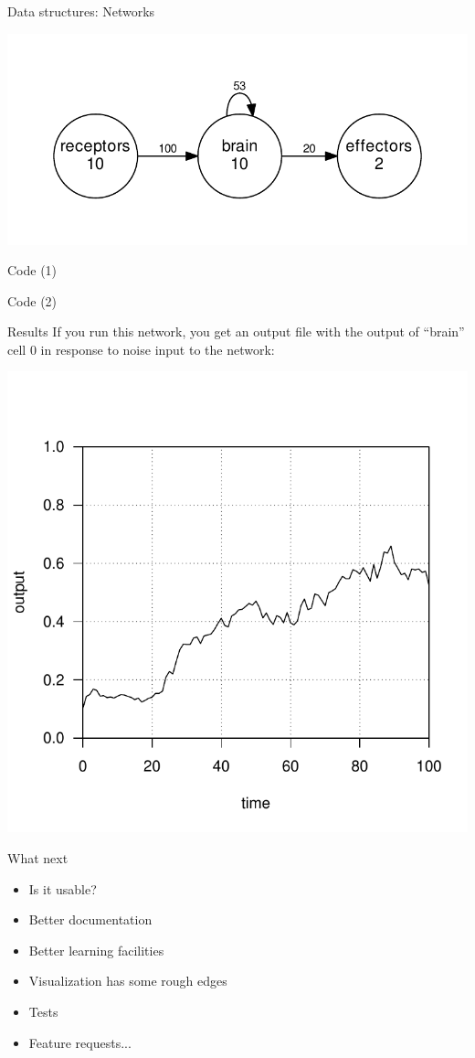 \documentclass[12pt]{beamer}
\begin{document}
\begin{frame}{Data structures: Networks}
  \begin{center}
  \includegraphics[width=.75\textwidth]{../../example/recnet/recnet-arc}
  \pause
      
  \end{center}
  \vfill
\end{frame}

\begin{frame}[fragile]{Code (1)}
  
\end{frame}

\begin{frame}[fragile]{Code (2)}
  
\end{frame}

\begin{frame}{Results}
  If you run this network, you get an output file with the output of
  ``brain'' cell 0 in response to noise input to the network:
  \begin{center}
    \includegraphics[width=.65\textwidth]{../../example/recnet/recnet}
  \end{center}
  \vfill
\end{frame}

\begin{frame}{What next}
  \begin{itemize}
  \item Is it usable?
  \item Better documentation
  \item Better learning facilities
  \item Visualization has some rough edges
  \item Tests
  \item Feature requests...
  \end{itemize}
\end{frame}
\end{document}
